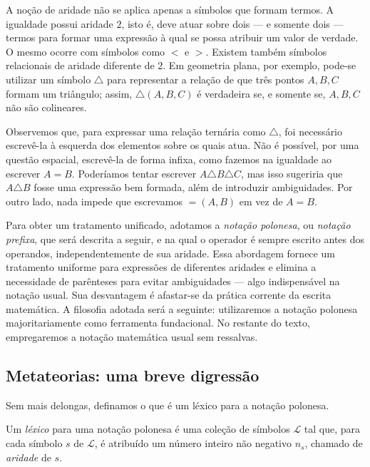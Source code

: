 A noção de aridade não se aplica apenas a símbolos que formam termos.
A igualdade possui aridade $2$, isto é, deve atuar sobre dois --- e somente dois --- termos para formar uma expressão à qual se possa atribuir um valor de verdade.
O mesmo ocorre com símbolos como $<$ e $>$.
Existem também símbolos relacionais de aridade diferente de $2$.
Em geometria plana, por exemplo, pode-se utilizar um símbolo $\triangle$ para representar a relação de que três pontos $A,B,C$ formam um triângulo; assim, $\triangle(A,B,C)$ é verdadeira se, e somente se, $A,B,C$ não são colineares.

Observemos que, para expressar uma relação ternária como $\triangle$, foi necessário escrevê-la à esquerda dos elementos sobre os quais atua.
Não é possível, por uma questão espacial, escrevê-la de forma infixa, como fazemos na igualdade ao escrever $A=B$.
Poderíamos tentar escrever $A\triangle B\triangle C$, mas isso sugeriria que $A\triangle B$ fosse uma expressão bem formada, além de introduzir ambiguidades.
Por outro lado, nada impede que escrevamos $=(A,B)$ em vez de $A=B$.

Para obter um tratamento unificado, adotamos a \emph{notação polonesa}, ou \emph{notação prefixa}, que será descrita a seguir, e na qual o operador é sempre escrito antes dos operandos, independentemente de sua aridade.
Essa abordagem fornece um tratamento uniforme para expressões de diferentes aridades e elimina a necessidade de parênteses para evitar ambiguidades --- algo indispensável na notação usual.
Sua desvantagem é afastar-se da prática corrente da escrita matemática.
A filosofia adotada será a seguinte: utilizaremos a notação polonesa majoritariamente como ferramenta fundacional.
No restante do texto, empregaremos a notação matemática usual sem ressalvas.


\subsection{Metateorias: uma breve digressão}\label{subsec:metateoriasBreveDigressao}
Sem mais delongas, definamos o que é um léxico para a notação polonesa.
\begin{metadefinition}\label{mdef:lexicoNotacaoPolonesa}
Um \emph{léxico} para uma notação polonesa é uma coleção de símbolos $\mathcal L$ tal que, para cada símbolo $s$ de $\mathcal L$, é atribuído um número inteiro não negativo $n_s$, chamado de \emph{aridade} de $s$.
\end{metadefinition}

